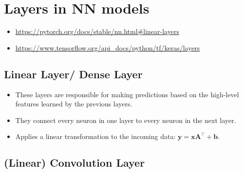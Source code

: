\chapter{Layers in NN models}

\begin{itemize}
    \item \url{https://pytorch.org/docs/stable/nn.html#linear-layers}
    \item \url{https://www.tensorflow.org/api_docs/python/tf/keras/layers}
\end{itemize}


\section{Linear Layer/ Dense Layer \cite{pytorch-Linear,gfg-convolutional-neural-network-cnn-in-machine-learning}}\label{nn: Linear Layer/ Dense Layer}

\begin{itemize}
    \item These layers are responsible for making predictions based on the high-level features learned by the previous layers. 
    
    \item They connect every neuron in one layer to every neuron in the next layer.
    
    \item Applies a linear transformation to the incoming data: $\mathbf{y=xA^\top+b}$.
\end{itemize}




\section{(Linear) Convolution Layer \cite{gfg-convolutional-neural-network-cnn-in-machine-learning}}\label{nn: Convolution Layer}

